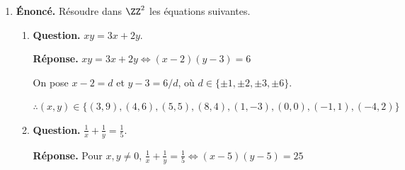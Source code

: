 \documentclass[12pt, a4paper]{article}
\begin{document}
\begin{enumerate}[label=2.\arabic*., start=17]
\begin{minipage}[t]{\linewidth}
\begin{enumerate}[\arabic*.]
        Parmi trois entiers consécutifs, l'un est divisible par $3$ et l'un est pair.
        $\therefore 6 \mid 5n^3 + n$

  \item \textbf{Question.} $5\mid2^{2n+1}+3^{2n+1}$.
\par\smallskip
\textbf{Réponse.} $2^{2n+1} + 3^{2n+1} \equiv 2^{2n+1} + (-2)^{2n+1} = 0 \pmod 5$

        $\therefore 5 \mid 2^{2n+1} + 3^{2n+1}$

  \item \textbf{Question.} $11\mid2^{123}+3^{121}$.
\par\smallskip
\textbf{Réponse.} $2^{10} \equiv 1 \pmod{11}$ et $3^5 \equiv 1 \pmod{11}$, donc
        \[
          2^{123} + 3^{121} \equiv (2^{10})^{12}2^3 + (3^5)^{24}3
          \equiv 8 + 3 \equiv 0 \pmod{11}
        \]
        $\therefore 11 \mid 2^{123} + 3^{121}$

  \item \textbf{Question.} $9\mid4^n+6n-1$.
\par\smallskip
\textbf{Réponse.} Par le binôme de Newton, $4^n = (1+3)^n \equiv 1 + 3n \pmod 9$, car les termes de degré au moins $2$ en $3$ sont divisibles par $9$.

        Alors $4^n + 6n - 1 \equiv 1 + 3n + 6n - 1 = 9n \equiv 0 \pmod 9$

        $\therefore 9 \mid 4^n + 6n - 1$

\end{enumerate}
\end{minipage}

  \item \begin{minipage}[t]{\linewidth}\raggedright
\textbf{Énoncé.} Résoudre dans $\ZZ^2$ les équations suivantes.

\begin{enumerate}[\arabic*.]
        \item \textbf{Question.} $xy=3x+2y$.
\par\smallskip
\textbf{Réponse.} $xy = 3x + 2y \iff (x-2)(y-3) = 6$

        On pose $x-2 = d$ et $y-3 = 6/d$, où $d \in \{\pm 1, \pm 2, \pm 3, \pm 6\}$.

        $\therefore (x, y) \in \{(3,9), (4,6), (5,5), (8,4), (1,-3), (0,0), (-1,1), (-4,2)\}$

  \item \textbf{Question.} $\displaystyle\frac1x+\frac1y=\frac15$.
\par\smallskip
\textbf{Réponse.} Pour $x, y \neq 0$, $\displaystyle \frac{1}{x} + \frac{1}{y} = \frac{1}{5} \iff (x-5)(y-5) = 25$


\end{enumerate}
\end{minipage}
\end{enumerate}
\end{document}
